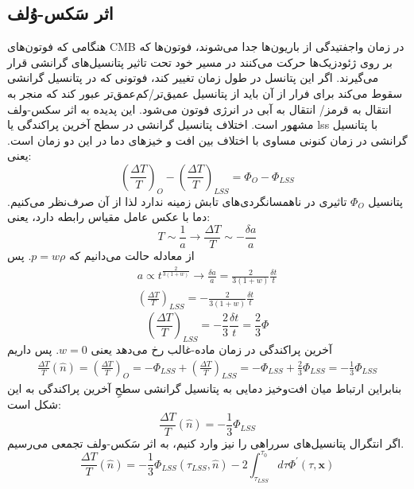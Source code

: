 \subsection{اثر سَکس-وُلف}
هنگامی که فوتون‌های CMB در زمان واجفتیدگی از باریون‌ها جدا می‌شوند، فوتون‌ها که بر روی ژئودزیک‌ها حرکت می‌کنند در مسیر خود تحت تاثیر پتانسیل‌های گرانشی قرار می‌گیرند. اگر این پتانسل در طول زمان تغییر کند، فوتونی که در پتانسیل گرانشی سقوط می‌کند برای فرار از آن باید از پتانسیل عمیق‌تر/کم‌عمق‌تر عبور کند که منجر به انتقال به قرمز/ انتقال به آبی در انرژی فوتون می‌شود.
\cite{durrer2015cosmic}
این پدیده به اثر سکس-ولف 
مشهور است.
\cite{sachs1967perturbations} 
اختلاف پتانسیل گرانشی در سطح آخرین پراکندگی یا lss با پتانسیل گرانشی در زمان کنونی مساوی با اختلاف بین افت و خیز‌های دما در این دو زمان است. یعنی: 
\begin{equation}
	\left(\frac{\Delta T}{T} \right)_O - \left(\frac{\Delta T}{T} \right)_{LSS} = \Phi_O-\Phi_{LSS}
\end{equation}
پتانسیل $\Phi_O$  تاثیری در ناهمسانگردی‌های تابش زمینه ندارد لذا از آن صرف‌نظر می‌کنیم. دما با عکس عامل مقیاس رابطه دارد، یعنی:
\begin{equation}
T \sim \frac{1}{a} \rightarrow  \frac{\Delta T}{T} \sim - \frac{\delta a}{a} 
\end{equation}
از معادله حالت می‌دانیم که $p=w\rho$. پس
\begin{align}
	a \propto t^{\frac{2}{3(1+w)}} \rightarrow \frac{\delta a}{a}=\frac{2}{3(1+w)}\frac{\delta t}{t}\\
	\left(\frac{\Delta T}{T} \right)_{LSS}=-\frac{2}{3(1+w)}\frac{\delta t}{t}
\end{align} 
\begin{equation}
	\left(\frac{\Delta T}{T} \right)_{LSS}=-\frac{2}{3} \frac{\delta t}{t}=\frac{2}{3}\Phi
\end{equation}
آخرین پراکندگی در زمان ماده-غالب رخ می‌دهد یعنی $w=0$. پس داریم
\begin{align}
	\frac{\Delta T}{T}(\hat{n})=\left(\frac{\Delta T}{T} \right)_O=-\Phi_{LSS}+\left(\frac{\Delta T}{T} \right)_{LSS} 
	=-\Phi_{LSS}+\frac{2}{3}\Phi_{LSS}=-\frac{1}{3}\Phi_{LSS}
\end{align}
بنابراین ارتباط میان افت‌وخیز دمایی به پتانسیل گرانشی سطحِ آخرین پراکندگی به این شکل است:
\begin{equation}
	\frac{\Delta T}{T}(\hat{n})=-\frac{1}{3}\Phi_{LSS}
\end{equation}
اگر انتگرال پتانسیل‌های سرراهی را نیز وارد کنیم، به اثر سَکس-ولف تجمعی
می‌رسیم.
\cite{alireza}
\begin{equation}
	\frac{\Delta T}{T}(\hat{n}) = - \frac{1}{3} \Phi_{LSS} ( \tau_{LSS} , \hat{n}) - 2 \int_{\tau_{LSS}}^{\tau_0} d \tau \Phi^\prime(\tau, \mathbf{x})
\end{equation}
   
